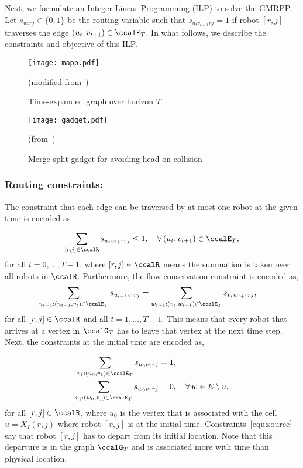 \documentclass[Afour,sageh,times]{sagej}
\begin{document}
{{Next, we formulate an Integer Linear Programming (ILP) to solve the GMRPP. Let $s_{uvrj} \in\{0,1\}$ be the routing variable such that $s_{u_{t}v_{t+1}rj} = 1$ if robot $[r,j]$ traverses the edge $(u_t,v_{t+1}) \in \ccalE_T$. In what follows, we describe the constraints and objective of this ILP.
\begin{figure}[t]
  \centering
  \texttt{[image: mapp.pdf]}
  \caption{Time-expanded graph over horizon $T$} (modified from~\cite{yu2016optimal})
  \label{fig:mapp}
\end{figure}

\begin{figure}[t]
  \centering
  \texttt{[image: gadget.pdf]}
  \caption{Merge-split gadget for avoiding head-on collision} (from~\cite{yu2016optimal})
  \label{fig:gadget}
\end{figure}
\setcounter{subsection}{1}
\subsubsection{Routing constraints:}
The constraint that each edge can be traversed by at most one robot at the given time is encoded as}
\begingroup\makeatletter{}\check@mathfonts
\def\maketag@@@#1{\hbox{\m@th\normalsize\normalfont#1}}%
\begin{align}
  \sum_{[r,j] \in \ccalR} s_{u_t v_{t+1}rj} \leq 1, \quad \forall \,(u_t,v_{t+1}) \in \ccalE_T,
\end{align}
\endgroup
for all $t=0,\ldots, T-1$, where $[r,j]\in\ccalR$ means the summation is taken over all robots in $\ccalR$. Furthermore, the flow conservation constraint is encoded as,
\begingroup\makeatletter\def\f@size{10}\check@mathfonts
\def\maketag@@@#1{\hbox{\m@th\normalsize\normalfont#1}}%
\begingroup
  \begin{align}\label{equ:flow}
  \sum_{u_{t-1}:(u_{t-1}, v_t) \in \ccalE_T}   s_{u_{t-1} v_t rj} &  =   \sum_{w_{t+1}:(v_t, w_{t+1}) \in \ccalE_T} s_{v_t w_{t+1} rj},
  \end{align}
\endgroup
for all $[r,j]\in \ccalR$ and all $t=1,\ldots,T-1$. This means that every robot that arrives at a vertex in $\ccalG_T$ has to leave that vertex at the next time step. Next, the constraints at the initial time are encoded as,
\begingroup\makeatletter\def\f@size{10}\check@mathfonts
\def\maketag@@@#1{\hbox{\m@th\normalsize\normalfont#1}}%
\begingroup

\begin{subequations}\label{equ:source}
  \begin{align}
    \sum_{v_1:(u_0, v_1) \in \ccalE_T} s_{u_0v_1 rj} &  = 1,  \\
    \sum_{v_1:(w_0, v_1) \in \ccalE_T} s_{w_0v_1 rj} & = 0, \quad \forall\, w \in E\setminus u,
  \end{align}
\end{subequations}
\endgroup
for all $[r,j]\in \ccalR$, where $u_0$ is the vertex that is associated with the cell $u = X_I(r,j)$ where robot $[r,j]$ is at the initial time. Constraints~\eqref{equ:source} say that robot $[r,j]$ has to depart from its initial location. Note that this departure is in the graph $\ccalG_T$ and is associated more with time than physical location.

}
\end{document}
